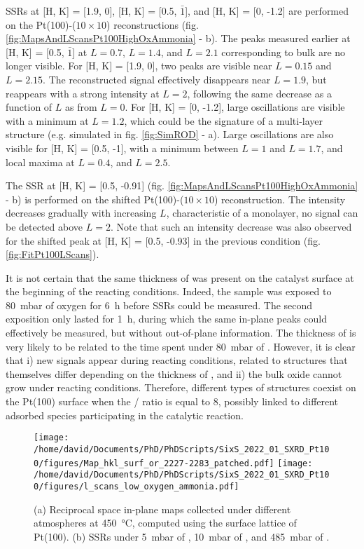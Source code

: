 SSRs at [H, K] = [1.9, 0], [H, K] = [0.5,  $\bar{1}$], and [H, K] = [0, -1.2] are performed on the Pt(100)-($10\times10$) reconstructions (fig. \ref{fig:MapsAndLScansPt100HighOxAmmonia} - b).
The peaks measured earlier at [H, K] = [0.5, $\bar{1}$] at $L=0.7$, $L=1.4$, and $L=2.1$ corresponding to bulk  are no longer visible.
For [H, K] = [1.9, 0], two peaks are visible near $L=0.15$ and $L=2.15$.
The reconstructed signal effectively disappears near $L=1.9$, but reappears with a strong intensity at $L=2$, following the same decrease as a function of $L$ as from $L=0$.
For [H, K] = [0, -1.2], large oscillations are visible with a minimum at $L=1.2$, which could be the signature of a multi-layer structure (e.g. simulated  in fig. \ref{fig:SimROD} - a).
Large oscillations are also visible for [H, K] = [0.5, -1], with a minimum between $L=1$ and $L=1.7$, and local maxima at $L=0.4$, and $L=2.5$.

The SSR at [H, K] = [0.5, -0.91] (fig. \ref{fig:MapsAndLScansPt100HighOxAmmonia} - b) is performed on the shifted Pt(100)-($10\times10$) reconstruction.
The intensity decreases gradually with increasing $L$, characteristic of a monolayer, no signal can be detected above $L=2$.
Note that such an intensity decrease was also observed for the shifted peak at [H, K] = [0.5, -0.93] in the previous condition (fig. \ref{fig:FitPt100LScans}).

It is not certain that the same thickness of  was present on the catalyst surface at the beginning of the reacting conditions.
Indeed, the sample was exposed to \qty{80}{\milli\bar} of oxygen for \qty{6}{\hour} before SSRs could be measured.
The second exposition only lasted for \qty{1}{\hour}, during which the same in-plane peaks could effectively be measured, but without out-of-plane information.
The thickness of  is very likely to be related to the time spent under \qty{80}{\milli\bar} of .
However, it is clear that i) new signals appear during reacting conditions, related to structures that themselves differ depending on the thickness of , and ii) the bulk oxide cannot grow under reacting conditions.
Therefore, different types of structures coexist on the Pt(100) surface when the / ratio is equal to \num{8}, possibly linked to different adsorbed species participating in the catalytic reaction.

\begin{figure}[!htb]
    \centering
    \texttt{[image: /home/david/Documents/PhD/PhDScripts/SixS\_2022\_01\_SXRD\_Pt100/figures/Map\_hkl\_surf\_or\_2227-2283\_patched.pdf]}
    \texttt{[image: /home/david/Documents/PhD/PhDScripts/SixS\_2022\_01\_SXRD\_Pt100/figures/l\_scans\_low\_oxygen\_ammonia.pdf]}
    \caption{
        (a) Reciprocal space in-plane maps collected under different atmospheres at \qty{450}{\degreeCelsius}, computed using the surface lattice of Pt(100).
        (b) SSRs under \qty{5}{\milli\bar} of , \qty{10}{\milli\bar} of , and \qty{485}{\milli\bar} of .
    }
    \label{fig:MapsAndLScansPt100LowOxAmmonia}
\end{figure}

